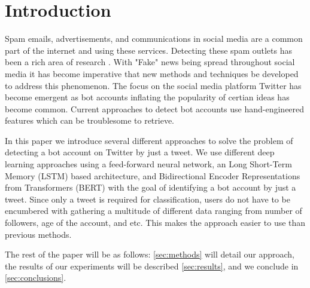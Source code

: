 \section{Introduction}
\label{sec:introduction}

Spam emails, advertisements, and communications in social media are a
common part of the internet and using these services. Detecting these
spam outlets has been a rich area of research
\citep{Cormack:2008:ESF:1454707.1454708,
DBLP:journals/corr/cs-CL-0009009, Androutsopoulos2006LearningTF,
Bickel:2006:DSF:2976456.2976477, Bratko:2006:SFU:1248547.1248644,
Solan:inproceedings, Cresci:2017:PSS:3041021.3055135, fameforsale2015,
INUWADUTSE2018496, FM2793, 8424744}.  With "Fake" news being spread
throughout social media \citep{NBERw25223} it has become imperative
that new methods and techniques be developed to address this
phenomenon. The focus on the social media platform Twitter has become
emergent \citep{8424744, FM2793, INUWADUTSE2018496,
Cresci:2017:PSS:3041021.3055135, fameforsale2015} as bot accounts
inflating the popularity of certian ideas has become common. Current
approaches to detect bot accounts use hand-engineered features which
can be troublesome to retrieve.

In this paper we introduce several different approaches to solve the
problem of detecting a bot account on Twitter by just a tweet. We use
different deep learning approaches using a feed-forward neural
network, an Long Short-Term Memory (LSTM) based architecture, and
Bidirectional Encoder Representations from Transformers (BERT) with
the goal of identifying a bot account by just a tweet. Since only a
tweet is required for classification, users do not have to be
encumbered with gathering a multitude of different data ranging from
number of followers, age of the account, and etc. This makes the
approach easier to use than previous methods.

The rest of the paper will be as follows: \cref{sec:methods} will
detail our approach, the results of our experiments will be described
\cref{sec:results}, and we conclude in \cref{sec:conclusions}.
